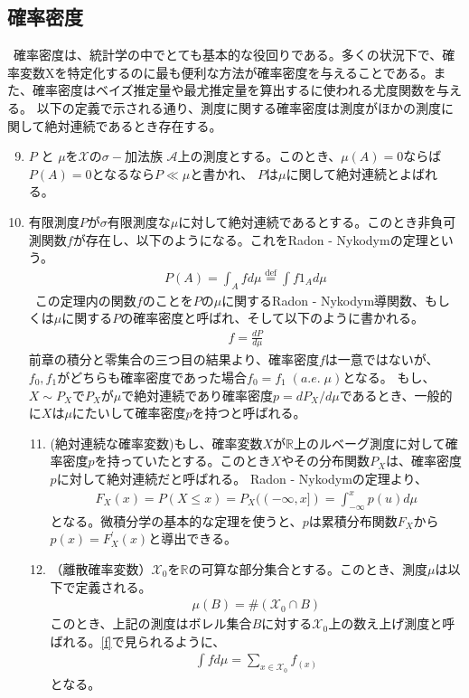 \documentclass[a4j,12pt]{jarticle}
\begin{document}
\subsection{確率密度}
\ 確率密度は、統計学の中でとても基本的な役回りである。多くの状況下で、確率変数Xを特定化するのに最も便利な方法が確率密度を与えることである。また、確率密度はベイズ推定量や最尤推定量を算出するに使われる尤度関数を与える。
以下の定義で示される通り、測度に関する確率密度は測度がほかの測度に関して絶対連続であるとき存在する。
\begin{enumerate}[label = 定義1.\arabic*.]
\setcounter{enumi}{8}
\item $P$ と $\mu$を$\mathcal{X}$の$\sigma-加法族$ $\mathcal{A}$上の測度とする。このとき、$\mu(A) = 0$ならば$P(A) = 0$となるなら$P \ll \mu$と書かれ、 $P$は$\mu$に関して絶対連続とよばれる。
\end{enumerate}
\begin{enumerate}[label = 定理1.\arabic* ]
\setcounter{enumi}{9}
\item 有限測度$P$が$\sigma$有限測度な$\mu$に対して絶対連続であるとする。このとき非負可測関数$f$が存在し、以下のようになる。これをRadon - Nykodymの定理という。
\begin{align*}
P(A) = \int_{A}f d\mu \stackrel{\mathrm{def}}{=} \int f 1_{A} d\mu
\end{align*}
\ この定理内の関数$f$のことを$Pの\mu$に関するRadon - Nykodym導関数、もしくは$\mu$に関する$P$の確率密度と呼ばれ、そして以下のように書かれる。
\begin{align*}
f = \frac{dP}{d\mu}
\end{align*}
前章の積分と零集合の三つ目の結果より、確率密度$f$は一意ではないが、$f_{0},f_{1}$がどちらも確率密度であった場合$f_{0} = f_{1}\;(a.e.\; \mu)$となる。
もし、$X \sim P_{X}$で$P_{X}$が$\mu$で絶対連続であり確率密度$p =dP_{X}/d\mu$であるとき、一般的に$X$は$\mu$にたいして確率密度$p$を持つと呼ばれる。
\begin{enumerate}[label = 例1.\arabic*]
\setcounter{enumii}{10}
\item (絶対連続な確率変数)もし、確率変数$X$が$\mathbb{R}$上のルベーグ測度に対して確率密度$p$を持っていたとする。このとき$X$やその分布関数$P_{X}$は、確率密度$p$に対して絶対連続だと呼ばれる。
Radon - Nykodymの定理より、
\begin{align*}
F_{X}(x) = P(X \leq x) = P_{X}((-\infty,x]) = \int_{-\infty}^{x} p(u) d\mu
\end{align*}
となる。微積分学の基本的な定理を使うと、$p$は累積分布関数$F_{X}$から$p(x) = F_{X}^{'}(x)$と導出できる。
\item （離散確率変数）$\mathcal{X}_{0}$を$\mathbb{R}$の可算な部分集合とする。このとき、測度$\mu$は以下で定義される。
\begin{align*}
\mu(B) = \#(\mathcal{X}_{0} \cap B)
\end{align*}
このとき、上記の測度はボレル集合$B$に対する$\mathcal{X}_{0}$上の数え上げ測度と呼ばれる。\ref{f}で見られるように、
\begin{align*}
\int f d\mu = \sum_{x \in \mathcal{X}_{0}}f_(x)
\end{align*}
となる。
\end{enumerate}
\end{enumerate}
\end{document}
